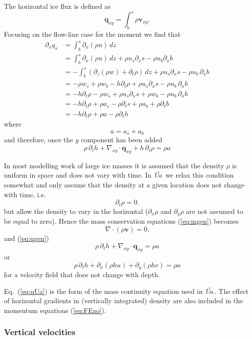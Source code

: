 \documentclass[10pt,a4paper]{book}
\newcommand{\p}{\partial}
\newcommand{\Ua}{\textsl{\'Ua}\,}
\begin{document}
The horizontal ice flux is defined as 
\[
\bm{q}_{xy}=\int_b^s \rho \bm{v}_{xy} .
\]
Focusing on the flow-line case for the moment we find that
\begin{align*}
\p_x q_x &= \int_b^s \p_x (\rho u) \, dz \\
        &= \int_b^s \p_x (\rho u) \, dz + \rho u_s \p_x s - \rho u_b \p_x b  \\
        &= -\int_b^s ( \p_z (\rho w)  +\p_t \rho ) \, dz+ \rho u_s \p_x s - \rho u_b \, \p_x b  \\
        &= -\rho w_s + \rho w_b  - h \p_t \rho + \rho u_s \p_x s - \rho u_b \,\p_x b  \\
        &= -h \p_t \rho - \rho w_s + \rho u_s \p_x s + \rho w_b - \rho u_b \,\p_x b  \\
        &= -h \p_t \rho + \rho a_s - \rho \p_t s + \rho a_b + \rho \p_t b \\
        &= -h \p_t \rho + \rho a - \rho \p_t h
\end{align*}
where
\[ a=a_s+a_b \]
and therefore, once the $y$ component has been added
\begin{equation}
\rho \, \p_t h + \nabla_{xy} \cdot \bm{q}_{xy} + h \, \p_t \rho = \rho a
\label{eq:qgen}
\end{equation}


In most modelling work of large ice masses it is assumed that the
density $\rho$ is uniform in space and does not vary with time.  In \Ua
we relax this condition somewhat and only assume that the density at a
given location does not change with time, i.e.\
\[
\p_t \rho =0 .
\]
but allow the density to vary in the horizontal ($\p_x \rho $ and
$\p_y \rho$ are not assumed to be equal to zero). Hence the mass
conservation equations (\ref{eq:mgen}) becomes
\[
 \nabla \cdot (\rho \bm{v})=0.
\]
and (\ref{eq:qgen})
\begin{equation}
\rho \, \p_t h + \nabla_{xy} \cdot \bm{q}_{xy}  = \rho 
a\label{eq:qUa}
\end{equation}
or
\begin{equation}
\rho \, \p_t h + \p_x (\rho h u) + \p_y (\rho h v)  = \rho a
\label{eq:mass}
\end{equation}
for a velocity field that does not change with depth.


Eq.~(\ref{eq:qUa}) is the form of the mass continuity equation used in
\Ua.  The effect of horizontal gradients in (vertically integrated)
density are also included in the momentum equations (\ref{eq:FEao}).


\subsubsection{Vertical velocities}
\end{document}
